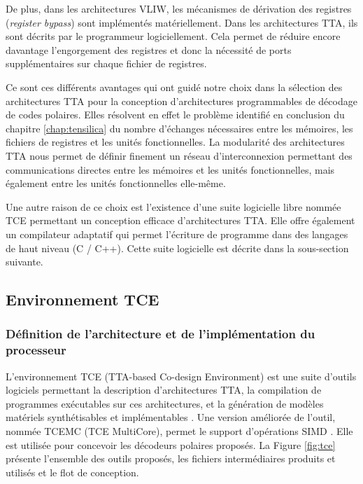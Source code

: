 De plus, dans les architectures VLIW, les mécanismes de dérivation des registres (\textit{register bypass}) sont implémentés matériellement. Dans les architectures TTA, ils sont décrits par le programmeur logiciellement. Cela permet de réduire encore davantage l'engorgement des registres et donc la nécessité de ports supplémentaires sur chaque fichier de registres.

Ce sont ces différents avantages qui ont guidé notre choix dans la sélection des architectures TTA pour la conception d'architectures programmables de décodage de codes polaires. Elles résolvent en effet le problème identifié en conclusion du chapitre \ref{chap:tensilica} du nombre d'échanges nécessaires entre les mémoires, les fichiers de registres et les unités fonctionnelles. La modularité des architectures TTA nous permet de définir finement un réseau d'interconnexion permettant des communications directes entre les mémoires et les unités fonctionnelles, mais également entre les unités fonctionnelles elle-même.

Une autre raison de ce choix est l'existence d'une suite logicielle libre nommée TCE permettant un conception efficace d'architectures TTA. Elle offre également un compilateur adaptatif qui permet l'écriture de programme dans des langages de haut niveau (C / C++). Cette suite logicielle est décrite dans la sous-section suivante.


\subsection{Environnement TCE}

\subsubsection{Définition de l'architecture et de l'implémentation du processeur}

L'environnement TCE (TTA-based Co-design Environment) est une suite d'outils logiciels permettant la description d'architectures TTA, la compilation de programmes exécutables sur ces architectures, et la génération de modèles matériels synthétisables et implémentables \cite{jaaskelainen_hw/sw_2017}. Une version améliorée de l'outil, nommée TCEMC (TCE MultiCore), permet le support d'opérations SIMD \cite{tcemc_2011}. Elle est utilisée pour concevoir les décodeurs polaires proposés. La Figure \ref{fig:tce} présente l'ensemble des outils proposés, les fichiers intermédiaires produits et utilisés et le flot de conception.

